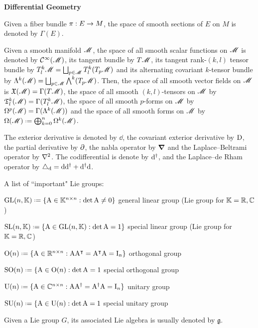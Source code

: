 \textbf{\sffamily Differential Geometry}

Given a fiber bundle $ \pi : E \rightarrow M $, the space of smooth sections of $ E $ on $ M $ is denoted by $ \Gamma(E) $.

Given a smooth manifold $ \mathscr{M} $, the space of all smooth scalar functions on $ \mathscr{M} $ is denoted by $ \mathcal{C}^{\infty}(\mathscr{M}) $, its tangent bundle by $ T\mathscr{M} $, its tangent rank-$ (k,l) $ tensor bundle by $ T^k_l \mathscr{M} = \bigsqcup_{p \in \mathscr{M}} T^k_l(T_p\mathscr{M}) $ and its alternating covariant $ k $-tensor bundle by $ \Lambda^{k}(\mathscr{M}) = \bigsqcup_{p \in \mathscr{M}} {\bigwedge}^{k}(T_p\mathscr{M}) $. Then, the space of all smooth vector fields on $ \mathscr{M} $ is $ \mathfrak{X}(\mathscr{M}) = \Gamma(T\mathscr{M}) $, the space of all smooth $ (k,l) $-tensors on $ \mathscr{M} $ by $ \mathfrak{T}^{k}_{l}(\mathscr{M}) = \Gamma(T^k_l\mathscr{M}) $, the space of all smooth $ p $-forms on $ \mathscr{M} $ by $ \Omega^{p}(\mathscr{M}) = \Gamma(\Lambda^{k}(\mathscr{M})) $ and the space of all smooth forms on $ \mathscr{M} $ by $ \dft \defeq \bigoplus_{k = 0}^n \df{k} $.

The exterior derivative is denoted by $ \dd $, the covariant exterior derivative by $ \mathrm{D} $, the partial derivative by $ \partial $, the nabla operator by $ \boldsymbol{\nabla} $ and the Laplace--Beltrami operator by $ \nabla^2 $. The codifferential is denote by $ \mathrm{d}^\dagger $, and the Laplace--de Rham operator by $ \triangle_{\mathrm{d}} = \mathrm{d} \mathrm{d}^\dagger + \mathrm{d}^\dagger \mathrm{d} $.

A list of ``important" Lie groups:

$ \GL{n,\K} \defeq \{\mt{A} \in \K^{n \times n} : \det \mt{A} \neq 0\} $ general linear group (Lie group for $ \mathbb{K} = \mathbb{R} , \mathbb{C} $)

$ \SL{n,\K} \defeq \{\mt{A} \in \GL{n,\K} : \det \mt{A} = 1\} $ special linear group (Lie group for $ \mathbb{K} = \mathbb{R} , \mathbb{C} $)

$ \On{n} \defeq \{\mt{A} \in \R^{n \times n} : \mt{A} \mt{A}\tsp = \mt{A}\tsp \mt{A} = \mt{I}_n\} $ orthogonal group

$ \SOn{n} \defeq \{\mt{A} \in \On{n} : \det \mt{A} = 1 $ special orthogonal group

$ \Un{n} \defeq \{\mt{A} \in \C^{n \times n} : \mt{A} \mt{A}\dg = \mt{A}\dg \mt{A} = \mt{I}_n\} $ unitary group

$ \SUn{n} \defeq \{\mt{A} \in \Un{n} : \det \mt{A} = 1 $ special unitary group

Given a Lie group $ G $, its associated Lie algebra is usually denoted by $ \mathfrak{g} $.










